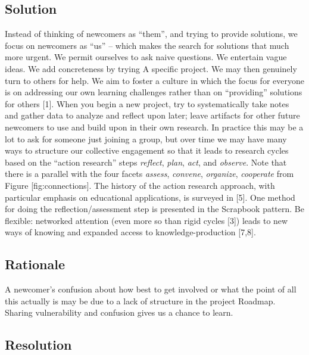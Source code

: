 \hypertarget{solution}{%
\subsection{Solution}\label{solution}}

Instead of thinking of newcomers as ``them'', and trying to provide
solutions, we focus on newcomers as ``us'' -- which makes the search for
solutions that much more urgent. We permit ourselves to ask naive
questions. We entertain vague ideas. We add concreteness by trying {{A
specific project}}. We may then genuinely turn to others for help. We
aim to foster a culture in which the focus for everyone is on addressing
our own learning challenges rather than on ``providing'' solutions for
others {{[}1{]}}. When you begin a new project, try to systematically
take notes and gather data to analyze and reflect upon later; leave
artifacts for other future newcomers to use and build upon in their own
research. In practice this may be a lot to ask for someone just joining
a group, but over time we may have many ways to structure our collective
engagement so that it leads to research cycles based on the ``action
research'' steps \emph{reflect}, \emph{plan}, \emph{act}, and
\emph{observe}. Note that there is a parallel with the four facets
\emph{assess}, \emph{convene}, \emph{organize}, \emph{cooperate} from
Figure {[}fig:connections{]}. The history of the action research
approach, with particular emphasis on educational applications, is
surveyed in {{[}5{]}}. One method for doing the reflection/assessment
step is presented in the {{Scrapbook}} pattern. Be flexible: networked
attention (even more so than rigid cycles {{[}3{]}}) leads to new ways
of knowing and expanded access to knowledge-production {{[}7,8{]}}.

\hypertarget{rationale}{%
\subsection{Rationale}\label{rationale}}

A newcomer's confusion about how best to get involved or what the point
of all this actually is may be due to a lack of structure in the project
{{Roadmap}}. Sharing vulnerability and confusion gives us a chance to
learn.

\hypertarget{resolution}{%
\subsection{Resolution}\label{resolution}}

